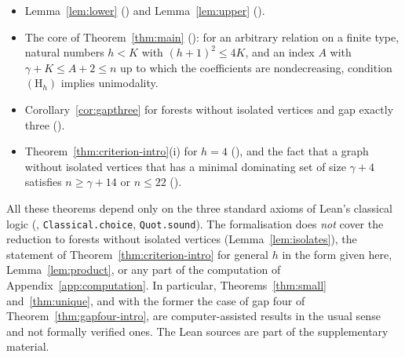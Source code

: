 \documentclass[smallextended,envcountsect,envcountsame]{svjour3}
\begin{document}
\begin{appendices}
\begin{itemize}
\item Lemma~\ref{lem:lower}
() and Lemma~\ref{lem:upper}
().
\item The core of Theorem~\ref{thm:main}
(): for an arbitrary relation on a
finite type, natural numbers $h<K$ with $(h+1)^2\le4K$, and an index $A$ with
$\gamma+K\le A+2\le n$ up to which the coefficients are nondecreasing,
condition $(\mathrm{H}_h)$ implies unimodality.
\item Corollary~\ref{cor:gapthree} for forests without isolated vertices and
gap exactly three ().
\item Theorem~\ref{thm:criterion-intro}(i) for $h=4$
(), and the fact that a graph
without isolated vertices that has a minimal dominating set of size
$\gamma+4$ satisfies $n\ge\gamma+14$ or $n\le22$
().
\end{itemize}

All these theorems depend only on the three standard axioms of Lean's
classical logic (, \texttt{Classical.choice},
\texttt{Quot.sound}). The formalisation does \emph{not} cover the reduction to
forests without isolated vertices (Lemma~\ref{lem:isolates}), the statement
of Theorem~\ref{thm:criterion-intro} for general $h$ in the form given here,
Lemma~\ref{lem:product}, or any part of the computation of
Appendix~\ref{app:computation}. In particular, Theorems~\ref{thm:small} and~\ref{thm:unique}, and
with the former the case of gap four of Theorem~\ref{thm:gapfour-intro}, are
computer-assisted results in the usual sense and not formally verified ones.
The Lean sources are part of the supplementary material.

\end{appendices}
\end{document}
